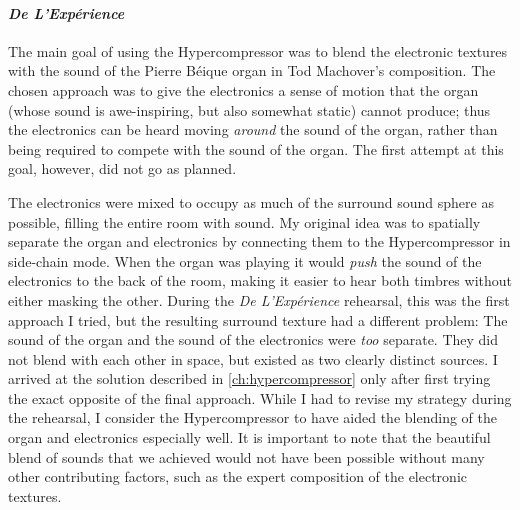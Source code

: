 \paragraph{\textit{De L'Exp\'{e}rience}}
The main goal of using the Hypercompressor was to blend the electronic
textures with the sound of the Pierre B\'{e}ique organ in Tod
Machover's composition. The chosen approach was to give the
electronics a sense of motion that the organ (whose sound is
awe-inspiring, but also somewhat static) cannot produce; thus the
electronics can be heard moving \emph{around} the sound of the organ,
rather than being required to compete with the sound of the organ.
The first attempt at this goal, however, did not go as planned.

The electronics were mixed to occupy as much of the surround sound
sphere as possible, filling the entire room with sound.  My original
idea was to spatially separate the organ and electronics by connecting
them to the Hypercompressor in side-chain mode.  When the organ was
playing it would \emph{push} the sound of the electronics to the back
of the room, making it easier to hear both timbres without either
masking the other.  During the \textit{De L'Exp\'{e}rience} rehearsal,
this was the first approach I tried, but the resulting surround
texture had a different problem: The sound of the organ and the sound
of the electronics were \emph{too} separate. They did not blend with
each other in space, but existed as two clearly distinct sources. I
arrived at the solution described in \autoref{ch:hypercompressor} only
after first trying the exact opposite of the final approach. While I
had to revise my strategy during the rehearsal, I consider the
Hypercompressor to have aided the blending of the organ and
electronics especially well. It is important to note that the
beautiful blend of sounds that we achieved would not have been possible
without many other contributing factors, such as the expert
composition of the electronic textures.

